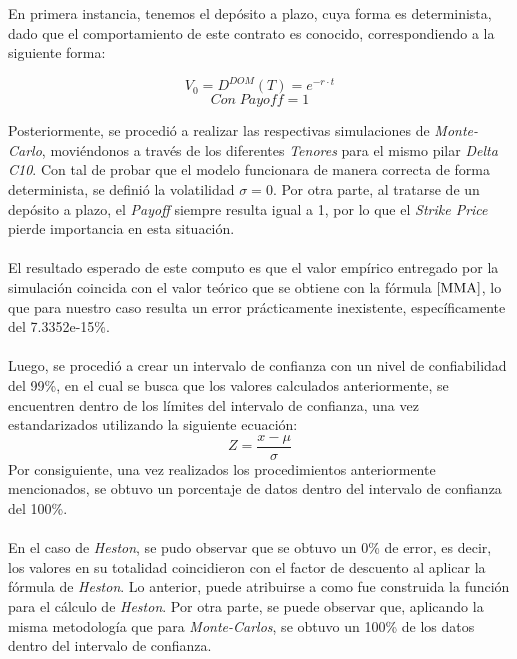 \noindent En primera instancia, tenemos el depósito a plazo, cuya forma es determinista, dado que el comportamiento de este contrato es conocido, correspondiendo a la siguiente forma:

\begin{equation}
    V_0=D^{DOM}(T)=e^{-r\cdot t}
    \label{MMA}
\end{equation}
\begin{equation*}
    Con \;Payoff=1
\end{equation*}

\noindent Posteriormente, se procedió a realizar las respectivas simulaciones de \textit{Monte-Carlo}, moviéndonos a través de los diferentes \textit{Tenores} para el mismo pilar \textit{Delta} \textit{C10}. Con tal de probar que el modelo funcionara de manera correcta de forma determinista, se definió la volatilidad $\sigma=0$. Por otra parte, al tratarse de un depósito a plazo, el \textit{Payoff} siempre resulta igual a 1, por lo que el \textit{Strike Price} pierde importancia en esta situación.\\\\
\noindent El resultado esperado de este computo es que el valor empírico entregado por la simulación coincida con el valor teórico que se obtiene con la fórmula $\ref{MMA}$, lo que para nuestro caso resulta un error prácticamente inexistente, específicamente del 7.3352e-15\%.\\\\
\noindent Luego, se procedió a crear un intervalo de confianza con un nivel de confiabilidad del 99\%, en el cual se busca que los valores calculados anteriormente, se encuentren dentro de los límites del intervalo de confianza, una vez estandarizados utilizando la siguiente ecuación:
\begin{equation}
    Z=\frac{x-\mu}{\sigma}
\end{equation}
\noindent Por consiguiente, una vez realizados los procedimientos anteriormente mencionados, se obtuvo un porcentaje de datos dentro del intervalo de confianza del 100\%.\\\\
\noindent En el caso de \textit{Heston}, se pudo observar que se obtuvo un 0\% de error, es decir, los valores en su totalidad coincidieron con el factor de descuento al aplicar la fórmula de \textit{Heston}. Lo anterior, puede atribuirse a como fue construida la función para el cálculo de \textit{Heston}. Por otra parte, se puede observar que, aplicando la misma metodología que para \textit{Monte-Carlos}, se obtuvo un 100\% de los datos dentro del intervalo de confianza.
\newpage
